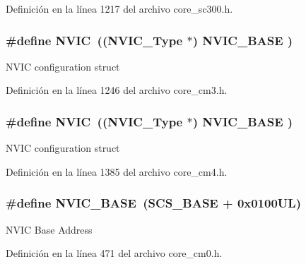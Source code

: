 Definición en la línea 1217 del archivo core\+\_\+sc300.\+h.

\subsubsection[{\texorpdfstring{N\+V\+IC}{NVIC}}]{\setlength{\rightskip}{0pt plus 5cm}\#define N\+V\+IC~(({\bf N\+V\+I\+C\+\_\+\+Type}      $\ast$)     {\bf N\+V\+I\+C\+\_\+\+B\+A\+SE}     )}\hypertarget{group___c_m_s_i_s__core__base_gac8e97e8ce56ae9f57da1363a937f8a17}{}\label{group___c_m_s_i_s__core__base_gac8e97e8ce56ae9f57da1363a937f8a17}
N\+V\+IC configuration struct 

Definición en la línea 1246 del archivo core\+\_\+cm3.\+h.

\subsubsection[{\texorpdfstring{N\+V\+IC}{NVIC}}]{\setlength{\rightskip}{0pt plus 5cm}\#define N\+V\+IC~(({\bf N\+V\+I\+C\+\_\+\+Type}      $\ast$)     {\bf N\+V\+I\+C\+\_\+\+B\+A\+SE}     )}\hypertarget{group___c_m_s_i_s__core__base_gac8e97e8ce56ae9f57da1363a937f8a17}{}\label{group___c_m_s_i_s__core__base_gac8e97e8ce56ae9f57da1363a937f8a17}
N\+V\+IC configuration struct 

Definición en la línea 1385 del archivo core\+\_\+cm4.\+h.

\subsubsection[{\texorpdfstring{N\+V\+I\+C\+\_\+\+B\+A\+SE}{NVIC_BASE}}]{\setlength{\rightskip}{0pt plus 5cm}\#define N\+V\+I\+C\+\_\+\+B\+A\+SE~({\bf S\+C\+S\+\_\+\+B\+A\+SE} +  0x0100\+U\+L)}\hypertarget{group___c_m_s_i_s__core__base_gaa0288691785a5f868238e0468b39523d}{}\label{group___c_m_s_i_s__core__base_gaa0288691785a5f868238e0468b39523d}
N\+V\+IC Base Address 

Definición en la línea 471 del archivo core\+\_\+cm0.\+h.

